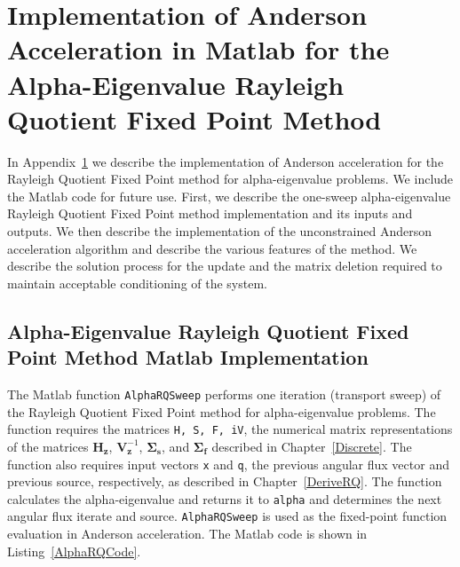 \chapter[Implementation of Anderson Acceleration in Matlab for the Alpha-Eigenvalue Rayleigh Quotient Fixed Point Method][Anderson Acceleration Matlab Implementation]{Implementation of Anderson Acceleration in Matlab for the Alpha-Eigenvalue Rayleigh Quotient Fixed Point Method}

\label{AnderAccMATLAB}

In Appendix~\ref{AnderAccMATLAB} we describe the implementation of Anderson acceleration for the Rayleigh Quotient Fixed Point method for alpha-eigenvalue problems. We include the Matlab code for future use. First, we describe the one-sweep alpha-eigenvalue Rayleigh Quotient Fixed Point method implementation and its inputs and outputs. We then describe the implementation of the unconstrained Anderson acceleration algorithm and describe the various features of the method. We describe the solution process for the update and the matrix deletion required to maintain acceptable conditioning of the system.

\section{Alpha-Eigenvalue Rayleigh Quotient Fixed Point Method Matlab Implementation}

\label{sec:AlphaRQSweep}

The Matlab function \texttt{AlphaRQSweep} performs one iteration (transport sweep) of the Rayleigh Quotient Fixed Point method for alpha-eigenvalue problems. The function requires the matrices \texttt{H, S, F, iV}, the numerical matrix representations of the matrices $\mathbf{H}_{\mathbf{z}}$, $\mathbf{V}_{\mathbf{z}}^{-1}$, $\mathbf{\Sigma_{s}}$, and $\mathbf{\Sigma_{f}}$ described in Chapter~\ref{Discrete}. The function also requires input vectors \texttt{x} and \texttt{q}, the previous angular flux vector and previous source, respectively, as described in Chapter~\ref{DeriveRQ}. The function calculates the alpha-eigenvalue and returns it to \texttt{alpha} and determines the next angular flux iterate and source. \texttt{AlphaRQSweep} is used as the fixed-point function evaluation in Anderson acceleration. The Matlab code is shown in Listing~\ref{AlphaRQCode}.

\clearpage



